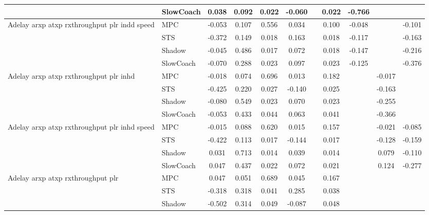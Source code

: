 \begin{tabular}{|l|l|*{9}{c|}}
                              & SlowCoach &    0.038 &     0.092 &     0.022 & -0.060 &     &  0.022 &  -0.766 &      &       \\
\midrule
Adelay arxp atxp rxthroughput plr indd speed    & MPC &   -0.053 &     0.107 &     0.556 &  0.034 &     &  0.100 &  -0.048 &      &   -0.101 \\
                              & STS &   -0.372 &     0.149 &     0.018 &  0.163 &     &  0.018 &  -0.117 &      &   -0.163 \\
                              & Shadow &   -0.045 &     0.486 &     0.017 &  0.072 &     &  0.018 &  -0.147 &      &   -0.216 \\
                              & SlowCoach &   -0.070 &     0.288 &     0.023 &  0.097 &     &  0.023 &  -0.125 &      &   -0.376 \\
\midrule
Adelay arxp atxp rxthroughput plr inhd    & MPC &   -0.018 &     0.074 &     0.696 &  0.013 &     &  0.182 &      &  -0.017 &       \\
                              & STS &   -0.425 &     0.220 &     0.027 & -0.140 &     &  0.025 &      &  -0.163 &       \\
                              & Shadow &   -0.080 &     0.549 &     0.023 &  0.070 &     &  0.023 &      &  -0.255 &       \\
                              & SlowCoach &   -0.053 &     0.433 &     0.044 &  0.063 &     &  0.041 &      &  -0.366 &       \\
\midrule
Adelay arxp atxp rxthroughput plr inhd speed    & MPC &   -0.015 &     0.088 &     0.620 &  0.015 &     &  0.157 &      &  -0.021 &   -0.085 \\
                              & STS &   -0.422 &     0.113 &     0.017 & -0.144 &     &  0.017 &      &  -0.128 &   -0.159 \\
                              & Shadow &    0.031 &     0.713 &     0.014 &  0.039 &     &  0.014 &      &   0.079 &   -0.110 \\
                              & SlowCoach &    0.047 &     0.437 &     0.022 &  0.072 &     &  0.021 &      &   0.124 &   -0.277 \\
\midrule
Adelay arxp atxp rxthroughput plr    & MPC &    0.047 &     0.051 &     0.689 &  0.045 &     &  0.167 &      &      &       \\
                              & STS &   -0.318 &     0.318 &     0.041 &  0.285 &     &  0.038 &      &      &       \\
                              & Shadow &   -0.502 &     0.314 &     0.049 & -0.087 &     &  0.048 &      &      &       \\

\end{tabular}
